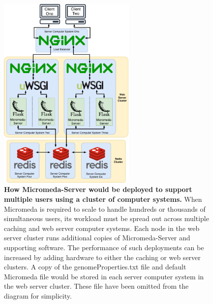 \begin{figure}[!ht]
  \centering
	\includegraphics[width=0.60\textwidth]{media/micromeda-heavy-deployment.pdf}
	 \caption[How Micromeda-Server would be deployed to support multiple users 
using a cluster of computer systems.]{\textbf{How Micromeda-Server would be 
deployed to support multiple users using a cluster of computer systems.} When 
Micromeda is required to scale to handle hundreds or thousands of simultaneous 
users, its workload must be spread out across multiple caching and web server 
computer systems. Each node in the web server cluster runs additional copies of 
Micromeda-Server and supporting software. The performance of such deployments 
can be increased by adding hardware to either the caching or web server 
clusters. A copy of the genomeProperties.txt file and default Micromeda file 
would be stored in each server computer system in the web server cluster. These 
file have been omitted from the diagram for simplicity.}
	 \label{fig:micromeda-large-deploy}
\end{figure}

